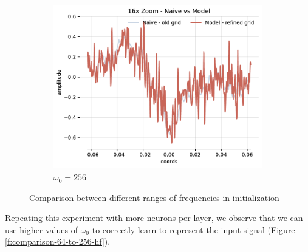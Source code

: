 \begin{figure}[h]
\begin{subfigure}[b]{0.32\textwidth}
        \centering
        \includegraphics[width=\textwidth]{img/ch4/16x-zoom-1hl-32hf-256hz.pdf}
        \caption{$\omega_0=256$}
        \label{fig:16x-zoom-1hl-32hf-256hz}
    \end{subfigure}
    \caption{Comparison between different ranges of frequencies in initialization}
    \label{f:comparison-8-to-256-hz}
\end{figure}


Repeating this experiment with more neurons per layer, we observe that we can use higher values of $\omega_0$ to correctly learn to represent the input signal (Figure \ref{f:comparison-64-to-256-hf}).


